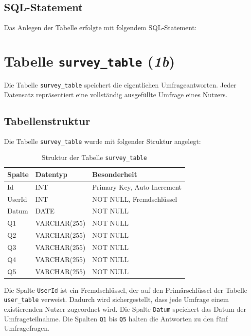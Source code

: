 \subsection{\acs{SQL}-Statement}

Das Anlegen der Tabelle erfolgte mit folgendem \acs{SQL}-Statement:




\section{Tabelle \texttt{survey\_table} (\textit{1b})}

Die Tabelle \texttt{survey\_table} speichert die eigentlichen Umfrageantworten. Jeder Datensatz repräsentiert eine vollständig ausgefüllte Umfrage eines Nutzers.

\subsection{Tabellenstruktur}

Die Tabelle \texttt{survey\_table} wurde mit folgender Struktur angelegt:

\begin{table}[h]
\centering
\begin{tabular}{|l|l|l|}
\hline
\textbf{Spalte} & \textbf{Datentyp} & \textbf{Besonderheit} \\
\hline
Id & INT & Primary Key, Auto Increment \\
UserId & INT & NOT NULL, Fremdschlüssel \\
Datum & DATE & NOT NULL \\
Q1 & VARCHAR(255) & NOT NULL \\
Q2 & VARCHAR(255) & NOT NULL \\
Q3 & VARCHAR(255) & NOT NULL \\
Q4 & VARCHAR(255) & NOT NULL \\
Q5 & VARCHAR(255) & NOT NULL \\
\hline
\end{tabular}
\caption{Struktur der Tabelle \texttt{survey\_table}}
\label{tab:survey_table}
\end{table}

Die Spalte \texttt{UserId} ist ein Fremdschlüssel, der auf den Primärschlüssel der Tabelle \texttt{user\_table} verweist. Dadurch wird sichergestellt, dass jede Umfrage einem existierenden Nutzer zugeordnet wird. Die Spalte \texttt{Datum} speichert das Datum der Umfrageteilnahme. Die Spalten \texttt{Q1} bis \texttt{Q5} halten die Antworten zu den fünf Umfragefragen.

